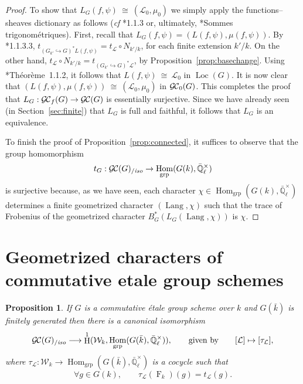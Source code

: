 \documentclass[11pt]{amsart}
\theoremstyle{plain}
\newtheorem{proposition}[theorem]{Proposition}
\theoremstyle{definition}
\theoremstyle{remark}
\newcommand{\EE}{\mathbb{\bar Q}_\ell}
\newcommand{\bFq}{\bar{k}}
\newcommand{\Fq}{k}
\newcommand{\EEx}{\EE^\times}
\newcommand{\Frob}[1]{{\operatorname{F}_{#1}}}
\DeclareMathOperator{\Hom}{Hom}
\DeclareMathOperator{\Hh}{H}
\newcommand{\iso}{{\ \cong\ }}
\newcommand{\cs}[1]{{\mathcal{#1}}}
\newcommand{\GC}{{\mathcal{G\hskip-0.8pt C}}}
\newcommand{\GCb}{{\GC_0}}
\newcommand{\GCf}{{\GC_f}}
\newcommand{\GCiso}[1]{\GC(#1)_{/\textit{iso}}}
\newcommand{\Lang}{{\operatorname{Lang}}}
\newcommand{\Weil}[1]{\mathcal{W}_{#1}}
\newcommand{\Loc}{{\operatorname{Loc}}}
\newcommand{\trFrob}[1]{t_{#1}}
\begin{document}
\begin{proof}
  To show that $L_G(f,\psi) \iso (\cs{L}_0,\mu_0)$ we simply apply the functions--sheaves dictionary
  as follows ({\it cf} \cite{Laumon}*{1.1.3} or, ultimately, \cite{SGA4.5}*{Sommes trigonométriques}).
  First, recall that $L_G(f,\psi) = (L(f,\psi), \mu(f,\psi))$. 
  By  \cite{Laumon}*{1.1.3.3}, $\trFrob{(G_{k'}\hookrightarrow G)^*L(f,\psi)} = \trFrob{\cs{L}} \circ N_{k'/k}$, for each finite extension $k'/k$.
  On the other hand, $\trFrob{\cs{L}} \circ N_{k'/k} = \trFrob{(G_{k'}\hookrightarrow G)^*\cs{L}}$,  by Proposition~\ref{prop:basechange}.
  Using \cite{Laumon}*{Th\'eor\`eme~1.1.2}, it follows that  $L(f,\psi) \iso \cs{L}_0$ in $\Loc(G)$.
  It is now clear that $(L(f,\psi),\mu(f,\psi)) \iso (\cs{L}_0,\mu_0)$ in $\GCb(G)$.
  This completes the proof that $L_G : \GCf(G) \to \GC(G)$ is essentially surjective.
  Since we have already seen (in Section~\ref{sec:finite}) that $L_G$ is full and faithful, 
  it follows that $L_G$ is an equivalence.
  
  To finish the proof of Proposition~\ref{prop:connected}, it suffices to observe that the group homomorphism
  \[
  \trFrob{G} : \GCiso{G} \to \Hom_\text{grp}(G(\Fq),\EEx)
  \]
  is surjective because, as we have seen, 
  each character $\chi \in \Hom_\text{grp}(G(\Fq),\EEx)$ determines a finite geometrized character $(\Lang,\chi)$
  such that the trace of Frobenius of the geometrized character $B_G^* (L_G(\Lang,\chi))$ is $\chi$.
\end{proof}

\section{Geometrized characters of commutative etale group schemes}

%

\begin{proposition}\label{prop:etale}
  If $G$ is a commutative \'etale group scheme over $\Fq$ and
  $G(\bFq)$ is finitely generated then there is a canonical
  isomorphism
  \[
  \GCiso{G} \longrightarrow \Hh^1(\Weil{\Fq}, \Hom_\text{grp}(G(\bFq),\EEx)),
  \qquad \text{given by}\qquad
  [\cs{L}] \mapsto [\tau_\cs{L}],
  \]
  where $\tau_\cs{L}: \Weil{\Fq}\to \Hom_\text{grp}(G(\bFq),\EEx)$ is a cocycle such that
  \[
  \forall g\in G(\Fq), \qquad \tau_\cs{L}(\Frob{\Fq})(g) = \trFrob{\cs{L}}(g).
  \]
\end{proposition}
\end{document}
